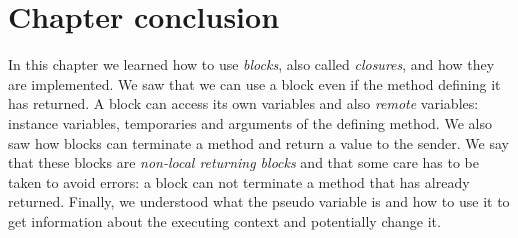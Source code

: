 \documentclass[a4paper,10pt,twoside]{book}
\begin{document}
\section{Chapter conclusion}


In this chapter we learned how to use \emph{blocks}, also called
\emph{closures}, and how they are implemented. We saw that we can use
a block even if the method defining it has returned. A block can
access its own variables and also \emph{remote} variables: instance
variables, temporaries and arguments of the defining method. We also
saw how blocks can terminate a method and return a value to the
sender. We say that these blocks are \emph{non-local returning blocks}
and that some care has to be taken to avoid errors: a block can not
terminate a method that has already returned. Finally, we understood
what the  pseudo variable is and how to use it to get
information about the executing context and potentially change it.

\ifx\wholebook\relax\else
   
   
\end{document}
